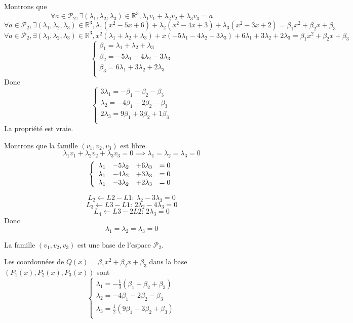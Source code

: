 \documentclass[]{book}
\theoremstyle{definition}
\newcommand{\bb}[1]{\mathbb{#1}}
\newcommand{\R}{\bb{R}}
\begin{document}
Montrons que
$$ \forall a \in \mathcal{P}_2, \exists (\lambda_1,\lambda_2,\lambda_3) \in \R^3,
\lambda_1 v_1 + \lambda_2 v_2 + \lambda_3 v_3 = a
$$
$$ \forall a \in \mathcal{P}_2, \exists (\lambda_1,\lambda_2,\lambda_3) \in \R^3,
\lambda_1 (x^2 -5x + 6) + \lambda_2 (x^2 -4x + 3) + \lambda_3 (x^2 -3x + 2) = \beta_1 x^2 + \beta_2 x + \beta_3
$$
$$ \forall a \in \mathcal{P}_2, \exists (\lambda_1,\lambda_2,\lambda_3) \in \R^3,
x^2 (\lambda_1 + \lambda_2 + \lambda_3) + x (-5\lambda_1 -4\lambda_2-3\lambda_3) + 6\lambda_1 + 3\lambda_2 + 2\lambda_3 = \beta_1 x^2 + \beta_2 x + \beta_3
$$
$$
\left\{ 
\begin{array}{l}
\beta_1 = \lambda_1 + \lambda_2 + \lambda_3 \\
\beta_2 = -5\lambda_1 -4\lambda_2-3\lambda_3 \\ 
\beta_3 = 6\lambda_1 + 3\lambda_2 + 2\lambda_3 \\
\end{array}
\right. 
$$
Donc
$$
\left\{ 
\begin{array}{l}
3\lambda_1 = -\beta_1 - \beta_2 - \beta_3 \\
\lambda_2 = -4\beta_1 - 2\beta_2 - \beta_3 \\
2\lambda_3 = 9\beta_1 + 3\beta_2 + 1\beta_3 \\
\end{array}
\right. 
$$
La propri\'et\'e est vraie.


Montrons que la famille $(v_1,v_2,v_3)$ est libre.
$$
\lambda_1 v_{1} +\lambda_2 v_{2} +\lambda_3 v_{3} = 0
\implies
\lambda_1=\lambda_2=\lambda_3=0
$$
$$
\left\{ 
\begin{array}{l l l l}
\lambda_1 & -5\lambda_2 & +6\lambda_3 & = 0 \\
\lambda_1 & -4\lambda_2 & +3\lambda_3 & = 0 \\
\lambda_1 & -3\lambda_2 & +2\lambda_3 & = 0 \\
\end{array}
\right. 
$$

$$L_2 \leftarrow L2-L1:\, \lambda_2 -3\lambda_3 = 0$$
$$L_3 \leftarrow L3-L1:\, 2\lambda_2 -4\lambda_3 = 0$$
$$L_4 \leftarrow L3-2L2:\, 2\lambda_3 = 0$$
Donc
$$
\lambda_1=\lambda_2=\lambda_3=0
$$

La famille $(v_1,v_2,v_3)$ est une base de l'espace $\mathcal{P}_2$.

Les coordonn\'ees de $Q(x) = \beta_1 x^2 + \beta_2 x + \beta_3$ dans la base $(P_1(x),P_2(x),P_3(x))$ sont
$$
\left\{ 
\begin{array}{l}
\lambda_1 = -\frac{1}{3}(\beta_1 + \beta_2 + \beta_3) \\
\lambda_2 = -4\beta_1 - 2\beta_2 - \beta_3 \\
\lambda_3 = \frac{1}{2}(9\beta_1 + 3\beta_2 + \beta_3) \\
\end{array}
\right. 
$$
\end{document}
